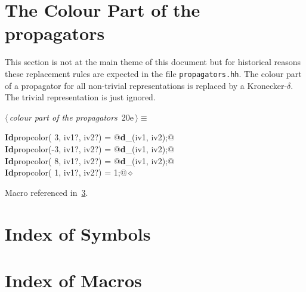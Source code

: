 \documentclass[a4paper,12pt]{amsart}
\renewcommand{\NWtarget}[2]{\hypertarget{#1}{#2}}
\renewcommand{\NWlink}[2]{\hyperlink{#1}{#2}}
\renewcommand{\NWtxtMacroRefIn}{Macro referenced in}
\renewcommand{\NWsep}{${\diamond}$}
\begin{document}
\section{The Colour Part of the propagators}
This section is not at the main theme of this document but for
historical reasons these replacement rules are expected in the
file \texttt{propagators.hh}. The colour part of a propagator
for all non-trivial representations is replaced by a Kronecker-$\delta$.
The trivial representation is just ignored.
\begin{flushleft} \small
\begin{minipage}{\linewidth}\label{scrap45}\raggedright\small
\NWtarget{nuweb20e}{} $\langle\,${\itshape colour part of the propagators}\nobreak\ {\footnotesize {20e}}$\,\rangle\equiv$
\vspace{-1ex}
\begin{list}{}{} \item
\mbox{}\verb@@\hbox{\sffamily\bfseries Id}\verb@ propcolor( 3, iv1?, iv2?) = @\hbox{\sffamily\bfseries d}\verb@_(iv1, iv2);@\\
\mbox{}\verb@@\hbox{\sffamily\bfseries Id}\verb@ propcolor(-3, iv1?, iv2?) = @\hbox{\sffamily\bfseries d}\verb@_(iv1, iv2);@\\
\mbox{}\verb@@\hbox{\sffamily\bfseries Id}\verb@ propcolor( 8, iv1?, iv2?) = @\hbox{\sffamily\bfseries d}\verb@_(iv1, iv2);@\\
\mbox{}\verb@@\hbox{\sffamily\bfseries Id}\verb@ propcolor( 1, iv1?, iv2?) = 1;@{\NWsep}
\end{list}
\vspace{-1.5ex}
\footnotesize
\begin{list}{}{\setlength{\itemsep}{-\parsep}\setlength{\itemindent}{-\leftmargin}}
\item \NWtxtMacroRefIn\ \NWlink{nuweb3}{3}.

\item{}
\end{list}
\end{minipage}\vspace{4ex}
\end{flushleft}

\appendix

\section{Index of Symbols}


\section{Index of Macros}
\end{document}
